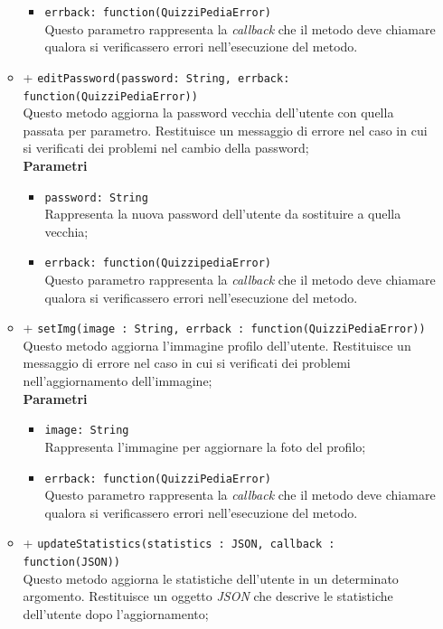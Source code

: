 \begin{itemize}
\begin{itemize}
\begin{itemize}
			\item	
				\texttt{errback: function(QuizziPediaError)} \\
				Questo parametro rappresenta la \textit{callback} che il metodo deve chiamare qualora si verificassero errori nell'esecuzione del metodo.
			\end{itemize}	
		\item	
		+ \texttt{editPassword(password: String, errback: function(QuizziPediaError))} \\
		Questo metodo aggiorna la password vecchia dell'utente con quella passata per parametro. Restituisce un messaggio di errore nel caso in cui si verificati dei problemi nel cambio della password;	\\
		\textbf{Parametri} 
			\begin{itemize}
			\item
				\texttt{password: String} \\
				Rappresenta la nuova password dell'utente da sostituire a quella vecchia;
			\item	
				\texttt{errback: function(QuizzipediaError)} \\
				Questo parametro rappresenta la \textit{callback} che il metodo deve chiamare qualora si verificassero errori nell'esecuzione del metodo.
			\end{itemize}
		\item	
		+ \texttt{setImg(image : String, errback : function(QuizziPediaError))} \\	
		Questo metodo aggiorna l'immagine profilo dell'utente. Restituisce un messaggio di errore nel caso in cui si verificati dei problemi nell'aggiornamento dell'immagine;	\\	
		\textbf{Parametri} 
			\begin{itemize}
			\item
				\texttt{image: String} \\
				Rappresenta l'immagine per aggiornare la foto del profilo;
			\item	
				\texttt{errback: function(QuizziPediaError)} \\
				Questo parametro rappresenta la \textit{callback} che il metodo deve chiamare qualora si verificassero errori nell'esecuzione del metodo.
			\end{itemize}
		\item	
		+ \texttt{updateStatistics(statistics : JSON, callback : function(JSON))} \\	
		Questo metodo aggiorna le statistiche dell'utente in un determinato argomento. Restituisce un oggetto \textit{JSON} che descrive le statistiche dell'utente dopo l'aggiornamento;	\\	

\end{itemize}
\end{itemize}
